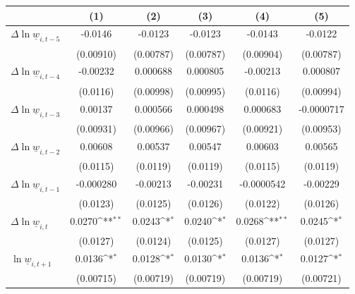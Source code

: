 {
\def\sym#1{\ifmmode^{#1}\else\(^{#1}\)\fi}
\begin{tabular}{l*{5}{c}}
\hline\hline
          &\multicolumn{1}{c}{(1)}         &\multicolumn{1}{c}{(2)}         &\multicolumn{1}{c}{(3)}         &\multicolumn{1}{c}{(4)}         &\multicolumn{1}{c}{(5)}         \\
\hline
$\Delta \ln \underline{w}_{i,t-5}$&  -0.0146         &  -0.0123         &  -0.0123         &  -0.0143         &  -0.0122         \\
          &(0.00910)         &(0.00787)         &(0.00787)         &(0.00904)         &(0.00787)         \\
[1em]
$\Delta \ln \underline{w}_{i,t-4}$& -0.00232         & 0.000688         & 0.000805         & -0.00213         & 0.000807         \\
          & (0.0116)         &(0.00998)         &(0.00995)         & (0.0116)         &(0.00994)         \\
[1em]
$\Delta \ln \underline{w}_{i,t-3}$&  0.00137         & 0.000566         & 0.000498         & 0.000683         &-0.0000717         \\
          &(0.00931)         &(0.00966)         &(0.00967)         &(0.00921)         &(0.00953)         \\
[1em]
$\Delta \ln \underline{w}_{i,t-2}$&  0.00608         &  0.00537         &  0.00547         &  0.00603         &  0.00565         \\
          & (0.0115)         & (0.0119)         & (0.0119)         & (0.0115)         & (0.0119)         \\
[1em]
$\Delta \ln \underline{w}_{i,t-1}$&-0.000280         & -0.00213         & -0.00231         &-0.0000542         & -0.00229         \\
          & (0.0123)         & (0.0125)         & (0.0126)         & (0.0122)         & (0.0126)         \\
[1em]
$\Delta \ln \underline{w}_{i,t}$&   0.0270\sym{**} &   0.0243\sym{*}  &   0.0240\sym{*}  &   0.0268\sym{**} &   0.0245\sym{*}  \\
          & (0.0127)         & (0.0124)         & (0.0125)         & (0.0127)         & (0.0127)         \\
[1em]
$\ln \underline{w}_{i,t+1}$&   0.0136\sym{*}  &   0.0128\sym{*}  &   0.0130\sym{*}  &   0.0136\sym{*}  &   0.0127\sym{*}  \\
          &(0.00715)         &(0.00719)         &(0.00719)         &(0.00719)         &(0.00721)         \\

\end{tabular}}
